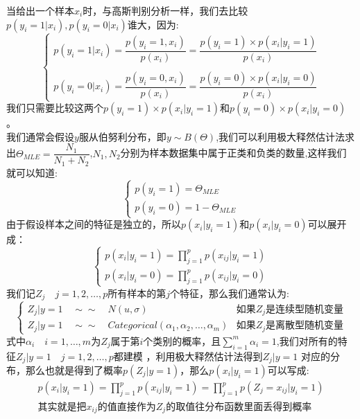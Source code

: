 \documentclass[withoutpreface,bwprint]{cumcmthesis} %
\begin{document}
	当给出一个样本$x_i$时，与高斯判别分析一样，我们去比较$p(y_i=1|x_i),p(y_i=0|x_i)$谁大，因为:
		\begin{equation}
		\begin{cases}
			p(y_i=1|x_i)=\dfrac{p(y_i=1,x_i)}{p(x_i)}=\dfrac{p(y_i=1) \times p(x_i|y_i=1)}{p(x_i)}
			\\\\
			p(y_i=0|x_i)=\dfrac{p(y_i=0,x_i)}{p(x_i)}=\dfrac{p(y_i=0) \times p(x_i|y_i=0)}{p(x_i)}
		\end{cases}
	\end{equation}
	我们只需要比较这两个$p(y_i=1) \times p(x_i|y_i=1)$和$p(y_i=0) \times p(x_i|y_i=0)$。\\
	我们通常会假设$y$服从伯努利分布，即$y\sim B(\Theta)$,我们可以利用极大释然估计法求出$\Theta_{MLE}=\dfrac{N_1}{N_1+N_2}$,$N_1,N_2$分别为样本数据集中属于正类和负类的数量,这样我们就可以知道:
	\begin{equation}
		\begin{cases}
			p(y_i=1)=\Theta_{MLE}\\
			p(y_i=0)=1-\Theta_{MLE}
		\end{cases}
	\end{equation}
	由于假设样本之间的特征是独立的，所以$p(x_i|y_i=1)$和$p(x_i|y_i=0)$可以展开成：
	\begin{equation}
		\begin{cases}
			p(x_i|y_i=1)=\prod \limits_{j=1}^p p(x_{ij}|y_i=1)  \\
			p(x_i|y_i=0)=\prod \limits_{j=1}^p p(x_{ij}|y_i=0)
		\end{cases}
	\end{equation}
	我们记$Z_j \quad j=1,2,\ldots,p$所有样本的第$j$个特征，那么我们通常认为:
	\begin{equation}
		\begin{cases}
			Z_j|y=1 \quad \sim\sim \quad N(u,\sigma) \quad \quad &\textbf{如果$Z_j$是连续型随机变量} \\
			Z_j|y=1 \quad \sim\sim \quad Categorical(\alpha_1,\alpha_2,\ldots,\alpha_m) &\textbf{如果$Z_j$是离散型随机变量}
		\end{cases}
	\end{equation}
	式中$\alpha_i \quad i=1,\ldots,m$为$Z_j$属于第$i$个类别的概率，且$\sum_{i=1}^{m}\alpha_{i}=1$,我们对所有的特征$Z_j|y=1 \quad j=1,2,\ldots,p$都建模
	，利用极大释然估计法得到$Z_j|y=1$ 对应的分布，那么也就是得到了概率$p(Z_j|y=1)$，那么$p(x_i|y_i=1)$可以写成:
	\begin{equation}
		\begin{aligned}
		p(x_i|y_i=1)=\prod \limits_{j=1}^p p(x_{ij}|y_i=1)=\prod \limits_{j=1}^p p(Z_j=x_{ij}|y_i=1)\\
		\textbf{其实就是把$x_{ij}$的值直接作为$Z_j$的取值往分布函数里面丢得到概率}
		\end{aligned}
	\end{equation}
\end{document}
